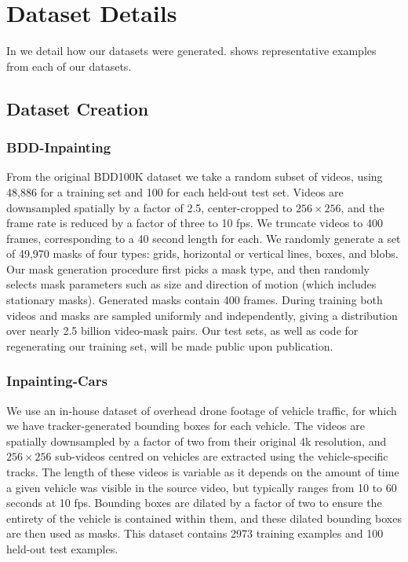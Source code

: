 \chapter{Dataset Details}
\label{app:datasetss}
In  we detail how our datasets were generated.  shows representative examples from each of our datasets.
\section{Dataset Creation}
\subsection{BDD-Inpainting}
\label{sec:datasetcreation}
From the original BDD100K dataset we take a random subset of videos, using 48,886 for a training set and 100 for each held-out test set. Videos are downsampled spatially by a factor of 2.5, center-cropped to $256 \times 256$, and the frame rate is reduced by a factor of three to 10 fps.  We truncate videos to 400 frames, corresponding to a 40 second length for each. We randomly generate a set of 49,970 masks of four types: grids, horizontal or vertical lines, boxes, and blobs. Our mask generation procedure first picks a mask type, and then randomly selects mask parameters such as size and direction of motion (which includes stationary masks). Generated masks contain 400 frames. During training both videos and masks are sampled uniformly and independently, giving a distribution over nearly 2.5 billion video-mask pairs. Our test sets, as well as code for regenerating our training set, will be made public upon publication.

\subsection{Inpainting-Cars}
 We use an in-house dataset of overhead drone footage of vehicle traffic, for which we have tracker-generated bounding boxes for each vehicle. The videos are spatially downsampled by a factor of two from their original 4k resolution, and  $256 \times 256$ sub-videos centred on vehicles are extracted using the vehicle-specific tracks. The length of these videos is variable as it depends on the amount of time a given vehicle was visible in the source video, but typically ranges from 10 to 60 seconds at 10 fps. Bounding boxes are dilated by a factor of two to ensure the entirety of the vehicle is contained within them, and these dilated bounding boxes are then used as masks. This dataset contains 2973 training examples and 100 held-out test examples. 

